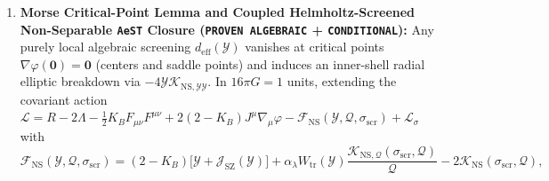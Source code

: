 \documentclass[11pt,a4paper]{article}
\begin{document}
\begin{enumerate}\setlength{\itemsep}{2pt}
\item \textbf{Morse Critical-Point Lemma and Coupled Helmholtz-Screened Non-Separable \texttt{AeST} Closure (\texttt{PROVEN ALGEBRAIC} + \texttt{CONDITIONAL}):} Any purely local algebraic screening $d_{\mathrm{eff}}(\mathcal{Y})$ vanishes at critical points $\nabla\varphi(\mathbf{0})=\mathbf{0}$ (centers and saddle points) and induces an inner-shell radial elliptic breakdown via $-4\mathcal{Y}\mathcal{K}_{\mathrm{NS},\mathcal{Y}\mathcal{Y}}$. In $16\pi G=1$ units, extending the covariant action $\mathcal{L} = R - 2\Lambda - \frac{1}{2}K_B F_{\mu\nu}F^{\mu\nu} + 2(2-K_B)J^\mu\nabla_\mu\varphi - \mathcal{F}_{\mathrm{NS}}(\mathcal{Y},\mathcal{Q},\sigma_{\mathrm{scr}}) + \mathcal{L}_\sigma$ with
\[
\mathcal{F}_{\mathrm{NS}}(\mathcal{Y},\mathcal{Q},\sigma_{\mathrm{scr}}) = (2-K_B)\bigl[\mathcal{Y}+\mathcal{J}_{\mathrm{SZ}}(\mathcal{Y})\bigr] + \alpha_\lambda W_{\mathrm{tr}}(\mathcal{Y})\frac{\mathcal{K}_{\mathrm{NS},\mathcal{Q}}(\sigma_{\mathrm{scr}},\mathcal{Q})}{\mathcal{Q}} - 2\mathcal{K}_{\mathrm{NS}}(\sigma_{\mathrm{scr}},\mathcal{Q}),
\]

\end{enumerate}
\end{document}
